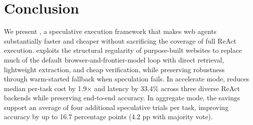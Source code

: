 \section{Conclusion}


We present \sys, a speculative execution framework that makes web agents substantially faster and cheaper without sacrificing the coverage of full ReAct execution. \sys exploits the structural regularity of purpose-built websites to replace much of the default browser-and-frontier-model loop with direct retrieval, lightweight extraction, and cheap verification, while preserving robustness through warm-started fallback when speculation fails. In accelerate mode, \sys reduces median per-task cost by 1.9$\times$ and latency by 33.4\% across three diverse ReAct backends while preserving end-to-end accuracy. In aggregate mode, the savings support an average of four additional speculative trials per task, improving accuracy by up to 16.7 percentage points (4.2 pp with majority vote). %